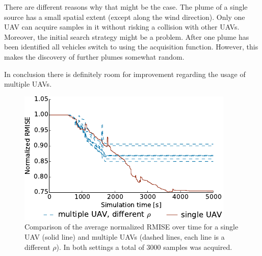 There are different reasons why that might be the case. The plume of a single 
source has a small spatial extent (except along the wind direction). Only one 
UAV can acquire samples in it without risking a collision with other UAVs.  
Moreover, the initial search strategy might be a problem. After one plume has 
been identified all vehicles switch to using the acquisition function. However, 
this makes the discovery of further plumes somewhat random.

In conclusion there is definitely room for improvement regarding the usage of 
multiple UAVs.

\begin{figure}
    \centering
    \includegraphics{plots/sv-vs-mv}
    \caption[Comparison of single and multiple UAV performance]{Comparison of 
        the average normalized RMISE over time for a single UAV (solid line) and 
        multiple UAVs (dashed lines, each line is a different $\rho$). In both 
        settings a total of \num{3000} samples was 
        acquired.}\label{fig:sv-vs-mv}
\end{figure}
